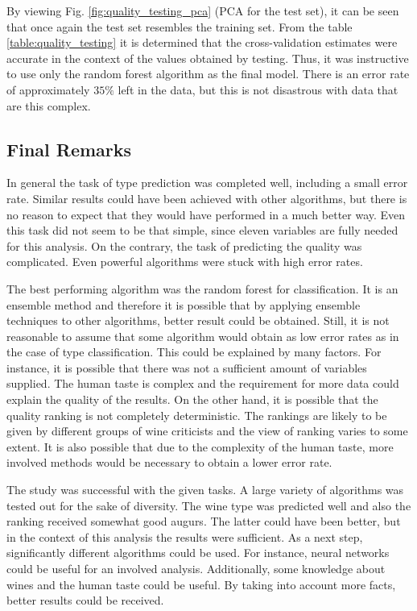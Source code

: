 \documentclass[twoside]{article}
\begin{document}
\begin{multicols}{2}
By viewing Fig. \ref{fig:quality_testing_pca} (PCA for the test set), it can be seen that once again the test set resembles the training set.
From the table \ref{table:quality_testing} it is determined that the cross-validation estimates were accurate in the context of the values
obtained by testing. Thus, it was instructive to use only the random forest algorithm as the final model. There is an error rate of approximately
$35 \%$ left in the data, but this is not disastrous with data that are this complex.

\subsection{Final Remarks}

In general the task of type prediction was completed well, including a small error rate. Similar results could have been
achieved with other algorithms, but there is no reason to expect that they would have performed in a much better way. Even this task did not seem 
to be that simple, since eleven variables are fully needed for this analysis. On the contrary, the task of predicting the quality was
complicated. Even powerful algorithms were stuck with high error rates.

The best performing algorithm was the random forest for classification. It is an ensemble method and therefore it is possible that by applying
ensemble techniques to other algorithms, better result could be obtained. Still, it is not reasonable to assume that some algorithm would obtain
as low error rates as in the case of type classification. This could be explained by many factors. For instance, it is possible that there was not 
a sufficient amount of variables supplied. The human taste is complex and the requirement for more data could explain the quality
of the results. On the other hand, it is possible that the quality ranking is not completely deterministic. The rankings are likely to be given by different
groups of wine criticists and the view of ranking varies to some extent. It is also possible that due to the complexity of the human
taste, more involved methods would be necessary to obtain a lower error rate.

The study was successful with the given tasks. A large variety of algorithms was tested out for the sake of diversity.
The wine type was predicted well and also the ranking received somewhat good augurs. The latter could have been better, but in the context of this
analysis the results were sufficient. As a next step, significantly different algorithms could be used. For instance, neural networks could be useful
for an involved analysis. Additionally, some knowledge about wines and the human taste could be useful. By taking into account more facts,
better results could be received. 


\end{multicols}
\end{document}
